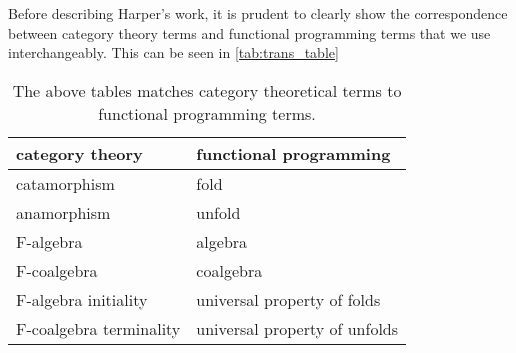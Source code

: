 Before describing Harper's work, it is prudent to clearly show the correspondence between category theory terms and functional programming terms that we use interchangeably.
This can be seen in \autoref{tab:trans_table}
\begin{table}[h]
  \centering
  \begin{tabular}{|l|l|}\hline
    \textbf{category theory} & \textbf{functional programming} \\\hline
    catamorphism             & fold                            \\
    anamorphism              & unfold                          \\
    F-algebra                & algebra                         \\
    F-coalgebra              & coalgebra                       \\
    F-algebra initiality     & universal property of folds     \\
    F-coalgebra terminality  & universal property of unfolds   \\\hline
  \end{tabular}
  \caption{The above tables matches category theoretical terms to functional programming terms.}
  \label{tab:trans_table}
\end{table}
